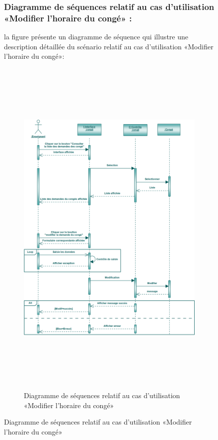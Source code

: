 \documentclass[12 pt]{report}
\begin{document}
\begin{figure}[h]
\begin{center}
\subsubsection{Diagramme de séquences relatif au cas d’utilisation «Modifier l'horaire du congé» :}
la figure   présente un diagramme de séquence qui illustre une description détaillée du scénario relatif au cas d’utilisation «Modifier l'horaire du congé»: 
\begin{figure}[h]
 \begin{center}
\includegraphics[width= 18 cm ,height=  17cm]{smc.PNG}
\caption{Diagramme de séquences relatif au cas d’utilisation «Modifier l'horaire du congé»}

\end{center}
\end{figure}

\end{center}
\end{figure}
\end{document}
